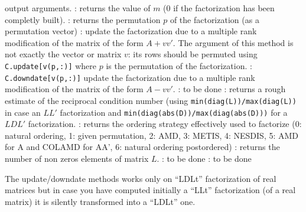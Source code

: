 \begin{varlist}
        output arguments.
  : returns the value of $m$ (0 if the factorization has been completly built).
  : returns the permutation $p$ of the factorization (as a permutation vector)         
  : update the factorization due to a multiple rank modification
        of the matrix of the form $A + vv'$. The argument of this method is not exactly the vector
        or matrix $v$: its rows should be permuted using \verb+C.update[v(p,:)]+ where $p$ is 
        the permutation of the factorization.
  : \verb+C.downdate[v(p,:)]+ update the factorization due to a multiple rank modification
        of the matrix of the form $A - vv'$.
  : to be done          
  : returns a rough estimate of the reciprocal condition number (using 
        \verb+min(diag(L))/max(diag(L))+ in case an $LL'$ factorization and 
        \verb+min(diag(abs(D))/max(diag(abs(D)))+ for a $LDL'$ factorization.
  : returns the ordering strategy effectively used to factorize
                        (0: natural ordering, 1: given permutation, 2: AMD, 3: METIS, 4: NESDIS, 5: AMD for A and COLAMD
  for AA', 6: natural ordering postordered)      
  : returns the number of non zeros elements of matrix $L$.        
  : to be done            
  : to be done         
\end{varlist}

The update/downdate methods works only on ``LDLt'' factorization of real matrices but in case you have 
computed initially a ``LLt'' factorization (of a real matrix) it is silently transformed into a ``LDLt'' one.
 
